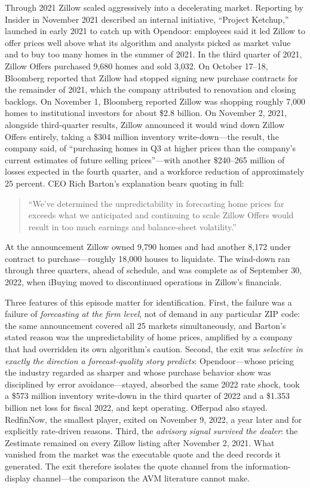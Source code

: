 \documentclass[12pt, letterpaper]{article}
\theoremstyle{remark}
\begin{document}
Through 2021 Zillow scaled aggressively into a decelerating market. Reporting by Insider in November 2021 described an internal initiative, ``Project Ketchup,'' launched in early 2021 to catch up with Opendoor: employees said it led Zillow to offer prices well above what its algorithm and analysts picked as market value and to buy too many homes in the summer of 2021. In the third quarter of 2021, Zillow Offers purchased 9{,}680 homes and sold 3{,}032. On October 17--18, Bloomberg reported that Zillow had stopped signing new purchase contracts for the remainder of 2021, which the company attributed to renovation and closing backlogs. On November 1, Bloomberg reported Zillow was shopping roughly 7{,}000 homes to institutional investors for about \$2.8 billion. On November 2, 2021, alongside third-quarter results, Zillow announced it would wind down Zillow Offers entirely, taking a \$304 million inventory write-down---the result, the company said, of ``purchasing homes in Q3 at higher prices than the company's current estimates of future selling prices''---with another \$240--265 million of losses expected in the fourth quarter, and a workforce reduction of approximately 25 percent. CEO Rich Barton's explanation bears quoting in full:

\begin{quote}
``We've determined the unpredictability in forecasting home prices far exceeds what we anticipated and continuing to scale Zillow Offers would result in too much earnings and balance-sheet volatility.''
\end{quote}

At the announcement Zillow owned 9{,}790 homes and had another 8{,}172 under contract to purchase---roughly 18{,}000 houses to liquidate. The wind-down ran through three quarters, ahead of schedule, and was complete as of September 30, 2022, when iBuying moved to discontinued operations in Zillow's financials.

Three features of this episode matter for identification. First, the failure was a failure of \emph{forecasting at the firm level}, not of demand in any particular ZIP code: the same announcement covered all 25 markets simultaneously, and Barton's stated reason was the unpredictability of home prices, amplified by a company that had overridden its own algorithm's caution. Second, the exit was \emph{selective in exactly the direction a forecast-quality story predicts}: Opendoor---whose pricing the industry regarded as sharper and whose purchase behavior \citet{buchak2025intermediating} show was disciplined by error avoidance---stayed, absorbed the same 2022 rate shock, took a \$573 million inventory write-down in the third quarter of 2022 and a \$1.353 billion net loss for fiscal 2022, and kept operating. Offerpad also stayed. RedfinNow, the smallest player, exited on November 9, 2022, a year later and for explicitly rate-driven reasons. Third, the \emph{advisory signal survived the dealer}: the Zestimate remained on every Zillow listing after November 2, 2021. What vanished from the market was the executable quote and the deed records it generated. The exit therefore isolates the quote channel from the information-display channel---the comparison the AVM literature cannot make.
\end{document}
